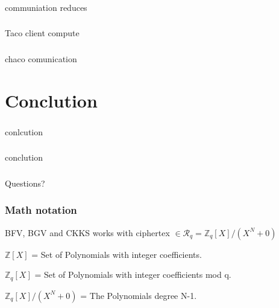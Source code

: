 \documentclass[10pt,handout]{beamer}
\begin{document}
\begin{frame}
\frametitle{}
communiation reduces
\end{frame}



\begin{frame}
\frametitle{}
Taco client compute
\end{frame}



\begin{frame}
\frametitle{}
chaco comunication
\end{frame}

\section{Conclution}
\begin{frame}
\frametitle{}
conlcution
\end{frame}


\begin{frame}
\frametitle{}
conclution
\end{frame}


\begin{frame}
\frametitle{}
\Huge

\begin{center}
   Questions?
\end{center}
\end{frame}




\begin{frame}[noframenumbering]
\frametitle{Math notation}
BFV, BGV and CKKS works with ciphertex  $\in \mathcal{R}_q =\mathbb{Z}_q[X]/(X^N+0)$

$\mathbb{Z}[X]$ = Set of Polynomials with integer coefficients.

$\mathbb{Z}_q[X]$ = Set of Polynomials with integer coefficients mod q.

$\mathbb{Z}_q[X]/(X^N+0)$ = The Polynomials degree N-1.


\end{frame}
\end{document}
